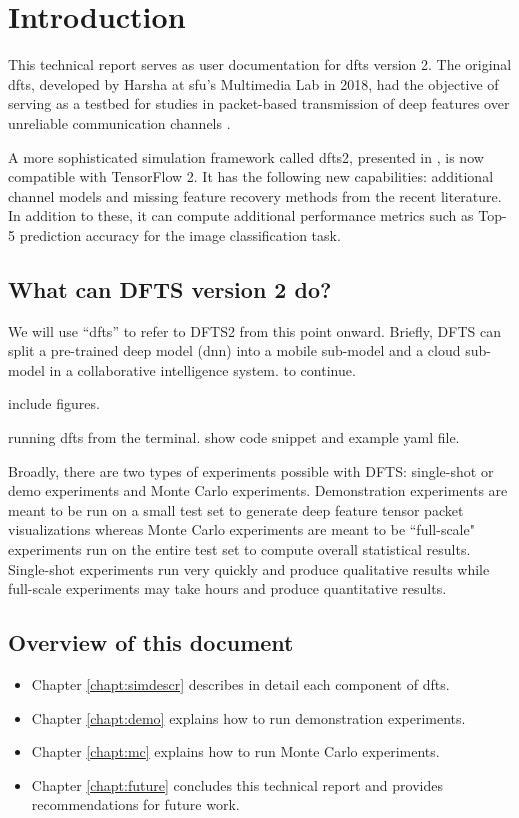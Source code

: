 \chapter{Introduction} \label{chapter:intro}
This technical report serves as user documentation for \gls{dfts} version 2. The original \gls{dfts}, developed by Harsha at \gls{sfu}'s Multimedia Lab in 2018, had the objective of serving as a testbed for studies in packet-based transmission of deep features over unreliable communication channels \cite{unnibhavi2018dfts}.

A more sophisticated simulation framework called \gls{dfts}2, presented in \cite{DFTS2_VCIP_2021}, is now compatible with TensorFlow 2. It has the following new capabilities: additional channel models and missing feature recovery methods from the recent literature. In addition to these, it can compute additional performance metrics such as Top-5 prediction accuracy for the image classification task.

\section{What can DFTS version 2 do?}
We will use ``\gls{dfts}'' to refer to DFTS2 from this point onward. Briefly, DFTS can split a pre-trained deep model (\gls{dnn}) into a mobile sub-model and a cloud sub-model in a collaborative intelligence system. to continue.

include figures.

running dfts from the terminal. show code snippet and example yaml file.

Broadly, there are two types of experiments possible with DFTS: single-shot or demo experiments and Monte Carlo experiments. Demonstration experiments are meant to be run on a small test set to generate deep feature tensor packet visualizations whereas Monte Carlo experiments are meant to be ``full-scale" experiments run on the entire test set to compute overall statistical results. Single-shot experiments run very quickly and produce qualitative results while full-scale experiments may take hours and produce quantitative results.


\section{Overview of this document}
\begin{itemize}
	\item Chapter \ref{chapt:simdescr} describes in detail each component of \gls{dfts}.
	\item Chapter \ref{chapt:demo} explains how to run demonstration experiments.
	\item Chapter \ref{chapt:mc} explains how to run Monte Carlo experiments.
	\item Chapter \ref{chapt:future} concludes this technical report and provides recommendations for future work.
\end{itemize}

